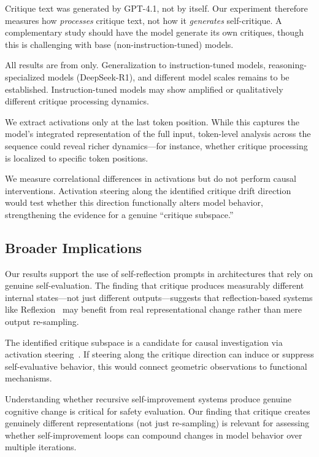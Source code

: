 Critique text was generated by GPT-4.1, not by \pythia itself. Our experiment therefore measures how \pythia \emph{processes} critique text, not how it \emph{generates} self-critique. A complementary study should have the model generate its own critiques, though this is challenging with base (non-instruction-tuned) models.

All results are from \pythia only. Generalization to instruction-tuned models, reasoning-specialized models (\eg DeepSeek-R1), and different model scales remains to be established. Instruction-tuned models may show amplified or qualitatively different critique processing dynamics.

We extract activations only at the last token position. While this captures the model's integrated representation of the full input, token-level analysis across the sequence could reveal richer dynamics---for instance, whether critique processing is localized to specific token positions.

We measure correlational differences in activations but do not perform causal interventions. Activation steering along the identified critique drift direction would test whether this direction functionally alters model behavior, strengthening the evidence for a genuine ``critique subspace.''

\subsection{Broader Implications}

Our results support the use of self-reflection prompts in architectures that rely on genuine self-evaluation. The finding that critique produces measurably different internal states---not just different outputs---suggests that reflection-based systems like Reflexion~\citep{shinn2023reflexion} may benefit from real representational change rather than mere output re-sampling.

The identified critique subspace is a candidate for causal investigation via activation steering~\citep{zou2023representation}. If steering along the critique direction can induce or suppress self-evaluative behavior, this would connect geometric observations to functional mechanisms.

Understanding whether recursive self-improvement systems produce genuine cognitive change is critical for safety evaluation. Our finding that critique creates genuinely different representations (not just re-sampling) is relevant for assessing whether self-improvement loops can compound changes in model behavior over multiple iterations.
